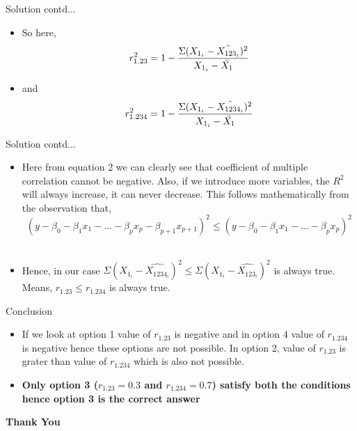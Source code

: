 \documentclass[aspectratio=169,xcolor=dvipsnames]{beamer}
\begin{document}
\begin{frame}{Solution contd...}
    \begin{itemize}
        \item So here,
\begin{equation}
    r_{1.23}^2 = 1 - \frac{\Sigma(X_{1_i} - \hat{X_{123_i}})^2}{X_{1_i} - \Bar{X_1}}
\end{equation}
\item and
\begin{equation}
    r_{1.234}^2 = 1 - \frac{\Sigma(X_{1_i} - \hat{X_{1234_i}})^2}{X_{1_i} - \Bar{X_1}}
\end{equation}
    \end{itemize}
\end{frame}
\begin{frame}{Solution contd...}
    \begin{itemize}
        \item Here from equation 2 we can clearly see that coefficient of multiple correlation cannot be negative. Also, if we introduce more variables, the \(R^2\) will always increase, it can never decrease. This follows mathematically from the observation that,\\
\begin{equation}
    (y - \beta_0 - \beta_1x_1 - \dots - \beta_px_p - \beta_{p+1}x_{p+1})^2 \leq (y - \beta_0 - \beta_1x_1 - \dots - \beta_px_p)^2
\end{equation} \\
\item Hence, in our case \(\Sigma(X_{1_i} - \hat{X_{1234_i}})^2 \leq \Sigma(X_{1_i} - \hat{X_{123_i}})^2\) is always true. Means, \(r_{1.23} \leq r_{1.234}\) is always true.
    \end{itemize}
\end{frame}
\begin{frame}{Conclusion}
\begin{itemize}
    \item If we look at option 1 value of \(r_{1.23}\) is negative and in option 4 value of  \(r_{1.234}\) is negative hence these options are not possible. In option 2, value of \(r_{1.23}\) is grater than value of \(r_{1.234}\) which is also not possible.
    \item \textbf{Only option 3 (\(r_{1.23} = 0.3\) and \(r_{1.234} = 0.7\)) satisfy both the conditions hence option 3 is the correct answer}
\end{itemize}
\end{frame}
\begin{frame}
    \Huge{\centerline{\textbf{Thank You}}}
\end{frame}
\end{document}
